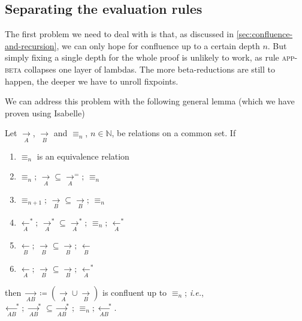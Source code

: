 \documentclass[acmsmall,review,dvipsnames]{acmart}
\newcommand{\Varid}[1]{\mathit{#1}}
\newcommand{\ie}{\emph{i.e.}}	%
\newcommand{\rulename}[1]{\textsc{\small #1}}
\newcommand{\movesto}{\longrightarrow}
\newcommand{\movesfrom}{\longleftarrow}
\begin{document}

\subsection{Separating the evaluation rules}
\label{sec:conf-proof-split}

The first problem we need to deal with is that, as discussed in \cref{sec:confluence-and-recursion}, we can only hope for confluence up to a certain depth $n$. But simply fixing a single depth for the whole proof is unlikely to work, as rule \rulename{app-beta} collapses one layer of lambdas. The more beta-reductions are still to happen, the deeper we have to unroll fixpoints.

We can address this problem with the following general lemma (which we have proven using Isabelle)
\begin{lemma}\label{lem:u-e}
Let \ensuremath{\underset{A}\movesto}, \ensuremath{\underset{B}\movesto} and \ensuremath{\equiv_{\Varid{n}}}, $n\in \mathbb{N}$, be relations on a common set. If
\begin{enumerate}
\item \ensuremath{\equiv_{\Varid{n}}} is an equivalence relation
\item \ensuremath{\equiv_{\Varid{n}};\,\underset{A}\movesto\mathrel{\subseteq}\underset{A}\movesto^{=};\,\equiv_{\Varid{n}}}
\item \ensuremath{\equiv_{\Varid{n}\mathbin{+}\mathrm{1}};\,\underset{B}\movesto\mathrel{\subseteq}\underset{B}\movesto;\,\equiv_{\Varid{n}}}
\item \ensuremath{\underset{A}\movesfrom^{\ast};\,\underset{A}\movesto^{\ast}\mathrel{\subseteq}\underset{A}\movesto^{\ast};\,\equiv_{\Varid{n}};\,\underset{A}\movesfrom^{\ast}}
\item \ensuremath{\underset{B}\movesfrom;\,\underset{B}\movesto\mathrel{\subseteq}\underset{B}\movesto;\,\underset{B}\movesfrom}
\item \ensuremath{\underset{A}\movesfrom;\,\underset{B}\movesto\mathrel{\subseteq}\underset{B}\movesto;\,\underset{A}\movesfrom^{\ast}}
\end{enumerate}
then \ensuremath{\underset{AB}\movesto\mathrel{\coloneqq}(\underset{A}\movesto\mathop{\cup}\underset{B}\movesto)} is confluent up to \ensuremath{\equiv_{\Varid{n}}}; {\ie},
\ensuremath{\underset{AB}\movesfrom^{\ast};\,\underset{AB}\movesto^{\ast}\mathrel{\subseteq}\underset{AB}\movesto^{\ast};\,\equiv_{\Varid{n}};\,\underset{AB}\movesfrom^{\ast}}.
\end{lemma}
\end{document}
